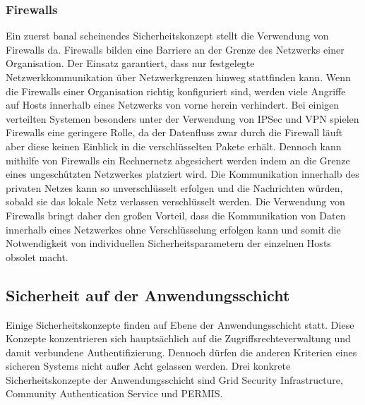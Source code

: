 \documentclass[utf8,biblatex]{lni}
\begin{document}
\subsubsection{Firewalls}

Ein zuerst banal scheinendes Sicherheitskonzept stellt die Verwendung von 
Firewalls da. Firewalls bilden eine Barriere an der Grenze des Netzwerks 
einer Organisation. Der Einsatz garantiert, dass nur festgelegte Netzwerkkommunikation
über Netzwerkgrenzen hinweg stattfinden kann. 
Wenn die Firewalls einer Organisation richtig konfiguriert sind, werden viele 
Angriffe auf Hosts innerhalb eines Netzwerks von vorne herein verhindert. 
Bei einigen verteilten Systemen besonders unter der Verwendung von IPSec und 
VPN spielen Firewalls eine geringere Rolle, da der Datenfluss zwar durch die Firewall 
läuft aber diese keinen Einblick in die verschlüsselten Pakete erhält. 
Dennoch kann mithilfe von Firewalls ein Rechnernetz abgesichert werden indem 
an die Grenze eines ungeschützten Netzwerkes platziert wird. 
Die Kommunikation innerhalb des privaten Netzes kann so unverschlüsselt erfolgen und 
die Nachrichten würden, sobald sie das lokale Netz verlassen verschlüsselt werden. 
Die Verwendung von Firewalls bringt daher den großen Vorteil, dass die Kommunikation 
von Daten innerhalb eines Netzwerkes ohne Verschlüsselung erfolgen kann und somit 
die Notwendigkeit von individuellen Sicherheitsparametern der einzelnen Hosts 
obsolet macht. 

\subsection{Sicherheit auf der Anwendungsschicht}

Einige Sicherheitskonzepte finden auf Ebene der Anwendungsschicht statt. Diese Konzepte konzentrieren sich hauptsächlich auf die Zugriffsrechteverwaltung und damit verbundene Authentifizierung. Dennoch dürfen die anderen Kriterien eines sicheren Systems nicht außer Acht gelassen werden. Drei konkrete Sicherheitskonzepte der Anwendungsschicht sind Grid Security Infrastructure, Community Authentication Service und PERMIS.
\end{document}

